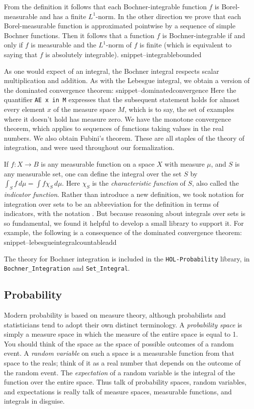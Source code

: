 \documentclass{svjour3}
\newcommand{\Snippet}[1]{\csname snippet--#1\endcsname}
\begin{document}
From the definition it follows that each Bochner-integrable function $f$ is Borel-measurable and has a finite $L^1$-norm. In the other direction we prove that each Borel-measurable function is approximated pointwise by a sequence of simple Bochner functions. Then it follows that a function $f$ is Bochner-integrable if and only if $f$ is measurable and the $L^1$-norm of $f$ is finite (which is equivalent to saying that $f$ is absolutely integrable).
\Snippet{integrablebounded}

As one would expect of an integral, the Bochner integral respects scalar multiplication and addition. As with the Lebesgue integral, we obtain a version of the dominated convergence theorem:
\Snippet{dominatedconvergence}
Here the quantifier \texttt{AE x in M} expresses that the subsequent statement holds for almost every element $x$ of the measure space $M$, which is to say, the set of examples where it doesn't hold has measure zero. We have the monotone convergence theorem, which applies to sequences of functions taking values in the real numbers. We also obtain Fubini's theorem. These are all staples of the theory of integration, and were used throughout our formalization.

If $f : X \to B$ is any measurable function on a space $X$ with measure $\mu$, and $S$ is any measurable set, one can define the integral over the set $S$ by $\int_S f \, d\mu = \int f \chi_S \, d\mu$. Here $\chi_S$ is the \emph{characteristic function} of $S$, also called the \emph{indicator function}. Rather than introduce a new definition, we took notation for integration over sets to be an abbreviation for the definition in terms of indicators, with the notation . But because reasoning about integrals over sets is so fundamental, we found it helpful to develop a small library to support it. For example, the following is a consequence of the dominated convergence theorem:
\Snippet{lebesgueintegralcountableadd}

The theory for Bochner integration is included in the \texttt{HOL-Probability} library, in \texttt{Bochner\_Integration} and \texttt{Set\_Integral}.

\subsection{Probability}
\label{subsection:probability}

Modern probability is based on measure theory, although probabilists and statisticians tend to adopt their own distinct terminology. A \emph{probability space} is simply a measure space in which the measure of the entire space is equal to 1. You should think of the space as the space of possible outcomes of a random event. A \emph{random variable} on such a space is a measurable function from that space to the reals; think of it as a real number that depends on the outcome of the random event. The \emph{expectation} of a random variable is the integral of the function over the entire space. Thus talk of probability spaces, random variables, and expectations is really talk of measure spaces, measurable functions, and integrals in disguise.
\end{document}
